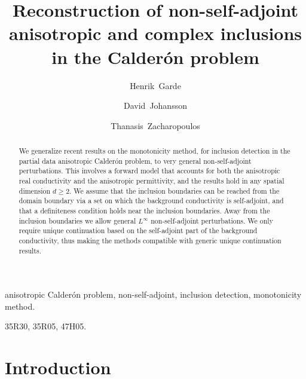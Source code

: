 \documentclass[reqno]{amsart}
\numberwithin{equation}{section}
\numberwithin{figure}{section}
\numberwithin{table}{section}
\theoremstyle{plain}
\theoremstyle{definition}
\theoremstyle{remark}
\begin{document}
	\title[Reconstruction of non-self-adjoint inclusions]{Reconstruction of non-self-adjoint anisotropic and complex inclusions in the Calder\'on problem}
	
	\author[H.~Garde]{Henrik~Garde}
	\address[H.~Garde]{Department of Mathematics, Aarhus University, Aarhus, Denmark.}
	
	\author[D.~Johansson]{David~Johansson}
	\address[D.~Johansson]{Department of Mathematics, Aarhus University, Aarhus, Denmark.}
	
	\author[T.~Zacharopoulos]{Thanasis~Zacharopoulos}
	\address[T.~Zacharopoulos]{Department of Mathematics, Aarhus University, Aarhus, Denmark.}
	
	\begin{abstract}
		We generalize recent results on the monotonicity method, for inclusion detection in the partial data anisotropic Calder\'on problem, to very general non-self-adjoint perturbations. This involves a forward model that accounts for both the anisotropic real conductivity and the anisotropic permittivity, and the results hold in any spatial dimension $d\geq 2$. We assume that the inclusion boundaries can be reached from the domain boundary via a set on which the background conductivity is self-adjoint, and that a definiteness condition holds near the inclusion boundaries. Away from the inclusion boundaries we allow general $L^\infty$ non-self-adjoint perturbations. We only require unique continuation based on the self-adjoint part of the background conductivity, thus making the methods compatible with generic unique continuation results.   
	\end{abstract}	
	\maketitle
	
	\KEY
	anisotropic Calder\'on problem, non-self-adjoint, inclusion detection, monotonicity method.
	\EndKEY
	
	\MSC
	35R30, 35R05, 47H05.
	\EndMSC
	
	\section{Introduction} \label{sec:intro}
	
\end{document}

